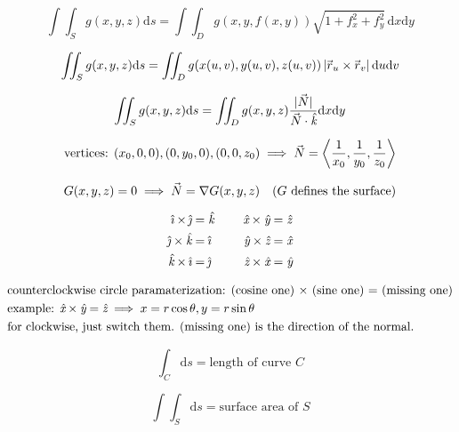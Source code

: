 \documentclass[12pt]{article}
\newcommand \hpx [1]{\hspace{#1px}}
\newcommand \nhpx [1]{\hspace{-#1px}}
\newcommand \abs [1]{\left|#1\right|}
\newcommand \rvec {\nhpx 1 \vec{\hpx 1 r}}
\newcommand \Nvec {\nhpx 0 \vec{\hpx 0 N}}
\newcommand \ihat {\hat{\nhpx 1 \textit \i}}
\newcommand \jhat {\hat{\nhpx 1 \textit \j}}
\newcommand \khat {\hpx 2 \hat{\nhpx 2\textit k}}
\newcommand \xhat {\hpx 2 \hat{\nhpx 2\textit x}}
\newcommand \yhat {\hpx 2 \hat{\nhpx 2\textit y}}
\newcommand \zhat {\hpx 2 \hat{\nhpx 2\textit z}}
\renewcommand \d {\mathrm d}
\newcommand \ds {\d s}
\newcommand \du {\d u}
\newcommand \dv {\d v}
\newcommand \dx {\d x}
\newcommand \dy {\d y}
\renewcommand \iint {\int \!\!\! \int}
\begin{document}
\begin{equation}
	\iint_S g(x, y, z) \ds = \iint_D g(x, y, f(x, y)) \sqrt{1 + f_x^2 + f_y^2} \, \dx \dy
\end{equation}

\begin{equation}
	\iint_S g(x, y, z) \ds = \iint_D g(x(u, v), y(u, v), z(u, v)) \abs{\rvec_u \times \rvec _v} \du \dv
\end{equation}

\begin{equation}
	\iint_S g(x, y, z) \ds = \iint_D g(x, y, z) \dfrac{|\Nvec|}{\Nvec \cdot \khat} \dx \dy
\end{equation}

\begin{equation}
	\text{vertices: }(x_0, 0, 0), (0, y_0, 0), (0, 0, z_0) \implies \Nvec = \left\langle\dfrac 1{x_0}, \dfrac 1{y_0}, \dfrac 1{z_0}\right\rangle
\end{equation}

\begin{equation}
	G(x, y, z) = 0 \implies \Nvec = \nabla G(x, y, z) ~~~ \text{($G$ defines the surface)}
\end{equation}

\begin{align}
	\ihat \times \jhat &= \khat ~~~~ & \xhat \times \yhat &= \zhat \\
	\jhat \times \khat &= \ihat ~~~~ & \yhat \times \zhat &= \xhat \\
	\khat \times \ihat &= \jhat ~~~~ & \zhat \times \xhat &= \yhat
\end{align}

\vspace{-20px}
\begin{align*}
	& \text{counterclockwise circle paramaterization: (cosine one) $\times$ (sine one) = (missing one)} \\
	& \text{example: $\xhat \times \yhat = \zhat \implies x = r\cos \theta, y = r \sin \theta$} \\
	& \text{for clockwise, just switch them. (missing one) is the direction of the normal.} \\
\end{align*}

\begin{equation}
	\int_C \ds = \text{length of curve $C$}
\end{equation}

\begin{equation}
	\iint_S \ds = \text{surface area of $S$}
\end{equation}
\end{document}
